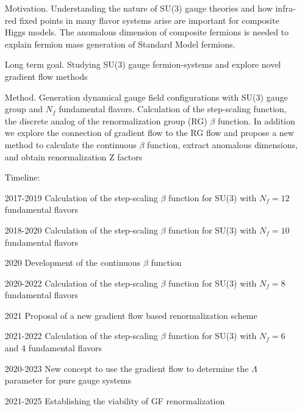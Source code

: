 \documentclass[prd,showpacs,showkeys,preprintnumbers,floatfix,
nofootinbib%
]{revtex4-2}
\begin{document}
\begin{itemize}
    \item[Motivation.]
     Understanding the nature of SU(3) gauge theories and how infra-red
     fixed points in many flavor systems arise are important for composite Higgs models. The anomalous dimension of composite fermions is needed to explain fermion mass generation of Standard Model fermions.  
    \item[Long term goal.] Studying SU(3) gauge fermion-systems and explore novel gradient flow methods
    \item[Method.] Generation dynamical gauge field configurations with
     SU(3) gauge group and $N_f$ fundamental flavors. Calculation of
     the step-scaling function, the discrete analog of the
     renormalization group (RG) $\beta$ function. In addition we
     explore the connection of gradient flow to the RG flow and propose
     a new method to calculate the continuous $\beta$ function,
     extract anomalous dimensions, and obtain renormalization Z factors
    \item[Timeline:]
    \item[2017-2019] Calculation of the step-scaling $\beta$ function
     for SU(3) with $N_f=12$ fundamental flavors
    \item[2018-2020] Calculation of the step-scaling $\beta$ function
     for SU(3) with $N_f=10$ fundamental flavors
    \item[2020] Development of the continuous $\beta$ function
    \item[2020-2022] Calculation of the step-scaling $\beta$ function
     for SU(3) with $N_f=8$ fundamental flavors
    \item[2021] Proposal of a new gradient flow based renormalization
     scheme
    \item[2021-2022] Calculation of the step-scaling $\beta$ function
     for SU(3) with $N_f=6$ and 4 fundamental flavors
    \item[2020-2023] New concept to use the gradient flow to determine
     the $\Lambda$ parameter for pure gauge systems
    \item[2021-2025] Establishing the viability of GF renormalization
\end{itemize}
\end{document}
